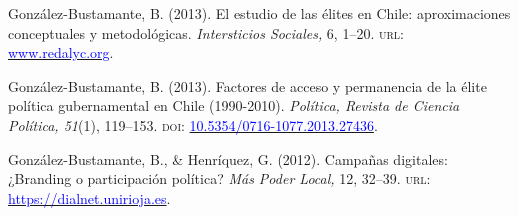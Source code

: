 \begin{publications}
\begin{benumerate}{14}
\item{\small González-Bustamante, B. (2013). El estudio de las élites en Chile: aproximaciones conceptuales y metodológicas. {\itshape Intersticios Sociales,} 6, 1--20. {\scshape url:} \href{https://www.redalyc.org/articulo.oa?id=421739499004}{\textcolor{blue}{www.redalyc.org}}.} \vspace{1mm}

\item{\small González-Bustamante, B. (2013). Factores de acceso y permanencia de la élite política gubernamental en Chile (1990-2010). {\itshape Política, Revista de Ciencia Política, 51}(1), 119--153. {\scshape doi}: \href{https://doi.org/10.5354/0716-1077.2013.27436}{\textcolor{blue}{10.5354/0716-1077.2013.27436}}.} \vspace{1mm} %

\item{\small González-Bustamante, B., \& Henríquez, G. (2012). Campañas digitales: ¿Branding o participación política? {\itshape Más Poder Local,} 12, 32--39. {\scshape url:} \href{https://dialnet.unirioja.es/servlet/articulo?codigo=4013864}{\textcolor{blue}{https://dialnet.unirioja.es}}.} \vspace{1mm} %

\end{benumerate}

\end{publications}
